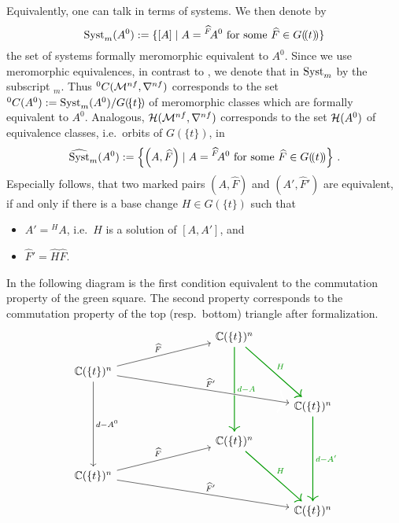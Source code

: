 Equivalently, one can talk in terms of systems. We then denote by
\[
  \operatorname{Syst}_m(A^0):=\{[A]
    \mid A={}^{\widehat F}\!A^0 \text{ for some } \widehat F\in G(\!(t)\!)\}
\]
the set of systems formally meromorphic equivalent to $A^0$.
Since we use meromorphic equivalences, in contrast to \cite{boalch,thboalch},
we denote that in $\operatorname{Syst}_m$ by the subscript ${}_m$.
Thus ${}^0C(\mathcal{M}^{nf},\nabla^{nf})$ corresponds to
the set ${}^0C(A^0):=\operatorname{Syst}_m(A^0)/G(\!\{t\}\!)$ of meromorphic classes which
are formally equivalent to $A^0$.
Analogous, $\mathcal{H}(\mathcal{M}^{nf},\nabla^{nf})$ corresponds to the set $\mathcal{H}(A^0)$ of
equivalence classes, i.e.\ orbits of $G(\!\{t\}\!)$, in
\[
  \widehat{\operatorname{Syst}}_m(A^0):=\left\{\left(A,\widehat F\right)
    \mid A={}^{\widehat F}\!A^0 \text{ for some } \widehat F\in G(\!(t)\!)\right\} \,.
\]
\label{page:ofDefnOfIsomOfMarkedPairs}
Especially follows, that two marked pairs $(A,\hat F)$ and $(A',\hat F')$ are
equivalent, if and only if there is a base change
$H\in G(\!\{t\}\!)$ such that
\begin{itemize}
  \item $A'={}^{H}\!A$, i.e.\ $H$ is a solution of $[A,A']$, and
  \item $\hat F'=\hat H\hat F$\PROBLEM[Source? correct? Maybe $\hat F'=H\hat F$].
\end{itemize}
In the following diagram is the first condition equivalent to the commutation
property of the \textcolor{green!60!black}{green} square. The second property
corresponds to the commutation property of the top (resp.\ bottom) triangle
after formalization\PROBLEM[?].
\[ \begin{tikzcd}[column sep=1cm,row sep=.5cm]
  &&&\C(\{t\})^n \arrow[green!60!black, thick]{ddd}{d-A}
    \arrow[green!60!black, thick]{ddr}{H}
\\\C(\{t\})^n \arrow{rrru}{\hat F}
  \arrow[ultra thick, white]{rrrrd}{\hat F'}
  \arrow{rrrrd}{\hat F'}
  \arrow{ddd}{d-A^0}
\\&&&&\C(\{t\})^n \arrow[green!60!black, thick]{ddd}{d-A'}
\\&&&\C(\{t\})^n \arrow[green!60!black, thick]{ddr}{H}
\\\C(\{t\})^n \arrow{rrru}{\hat F} \arrow{rrrrd}{\hat F'}
\\&&&&\C(\{t\})^n
\end{tikzcd} \]

